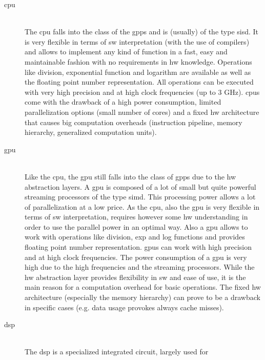 \documentclass[mscthesis]{usiinfthesis}
\begin{document}
\begin{description}
    \item[\acrshort{cpu}] \hfill \\
        The \acrfull{cpu} falls into the class of the \glspl{gpp} and is
        (usually) of the type \gls{sisd}. It is very flexible in terms of
        \gls{sw} interpretation (with the use of compilers) and allows to
        implement any kind of function in a fast, easy and maintainable fashion
        with no requirements in \gls{hw} knowledge.  Operations like division,
        exponential function and logarithm are available as well as the
        floating point number representation. All operations can be executed
        with very high precision and at high clock frequencies (up to 3 GHz).
        \glspl{cpu} come with the drawback of a high power consumption, limited
        parallelization options (small number of cores) and a fixed \gls{hw}
        architecture that causes big computation overheads (instruction
        pipeline, memory hierarchy, generalized computation units).
    \item[\acrshort{gpu}] \hfill \\
        Like the \gls{cpu}, the \acrfull{gpu} still falls into the class of
        \glspl{gpp} due to the \gls{hw} abstraction layers. A \gls{gpu} is
        composed of a lot of small but quite powerful streaming processors of
        the type \gls{simd}. This processing power allows a lot of
        parallelization at a low price. As the \gls{cpu}, also the \gls{gpu} is
        very flexible in terms of \gls{sw} interpretation, requires however
        some \gls{hw} understanding in order to use the parallel power in an
        optimal way. Also a \gls{gpu} allows to work with operations like
        division, exp and log functions and provides floating point number
        representation. \glspl{gpu} can work with high precision and at high
        clock frequencies. The power consumption of a \gls{gpu} is very high
        due to the high frequencies and the streaming processors.  While the
        \gls{hw} abstraction layer provides flexibility in \gls{sw} and ease of
        use, it is the main reason for a computation overhead for basic
        operations. The fixed \gls{hw} architecture (especially the memory
        hierarchy) can prove to be a drawback in specific cases (e.g. data
        usage provokes always cache misses).
    \item[\acrshort{dsp}] \hfill \\
        The \acrfull{dsp} is a specialized integrated circuit, largely used for

\end{description}
\end{document}
